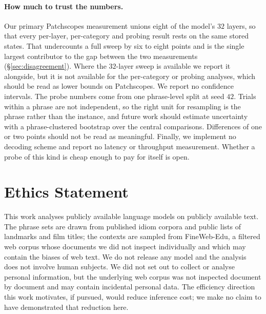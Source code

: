 \paragraph{How much to trust the numbers.}
Our primary Patchscopes measurement unions eight of the model's $32$ layers, so
that every per-layer, per-category and probing result rests on the same stored
states. That undercounts a full sweep by six to eight points and is the single
largest contributor to the gap between the two measurements
(\S\ref{sec:disagreement}). Where the $32$-layer sweep is available we report it
alongside, but it is not available for the per-category or probing analyses,
which should be read as lower bounds on Patchscopes. We report no confidence
intervals. The probe numbers come from one phrase-level split at seed $42$.
Trials within a phrase are not independent, so the right unit for resampling is
the phrase rather than the instance, and future work should estimate uncertainty with a phrase-clustered bootstrap
over the central comparisons. Differences of one or two points
should not be read as meaningful. Finally, we
implement no decoding scheme and report no latency or throughput measurement.
Whether a probe of this kind is cheap enough to pay for itself is open.

\section*{Ethics Statement}

This work analyses publicly available language models on publicly available
text. The phrase sets are drawn from published idiom corpora and public lists
of landmarks and film titles; the contexts are sampled from FineWeb-Edu, a
filtered web corpus whose documents we did not inspect individually and which
may contain the biases of web text. We do not release any model and the
analysis does not involve human subjects. We did not set out to collect or
analyse personal information, but the underlying web corpus was not inspected
document by document and may contain incidental personal data. The efficiency
direction this work motivates, if pursued, would reduce inference cost; we make
no claim to have demonstrated that reduction here.